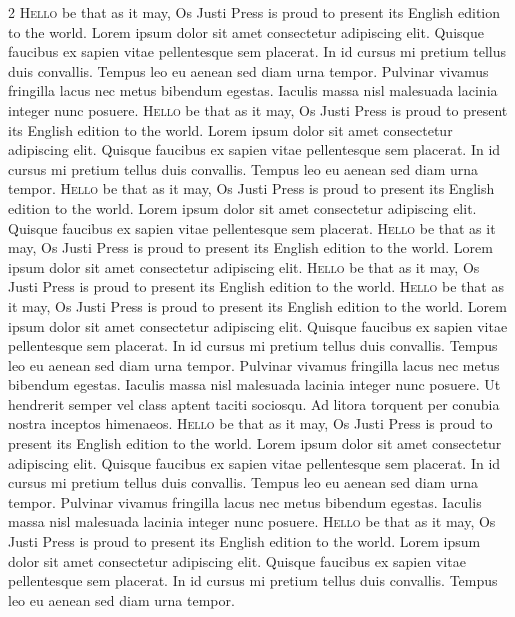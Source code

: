 \documentclass[openany]{book}
\begin{document}
\begin{multicols}{2}
\lettrine[lines=2]{H}{ello} be that as it may, Os Justi Press is proud to present its English edition to the world. Lorem ipsum dolor sit amet consectetur adipiscing elit. Quisque faucibus ex sapien vitae pellentesque sem placerat. In id cursus mi pretium tellus duis convallis. Tempus leo eu aenean sed diam urna tempor. Pulvinar vivamus fringilla lacus nec metus bibendum egestas. Iaculis massa nisl malesuada lacinia integer nunc posuere.
\lettrine[lines=2]{H}{ello} be that as it may, Os Justi Press is proud to present its English edition to the world. Lorem ipsum dolor sit amet consectetur adipiscing elit. Quisque faucibus ex sapien vitae pellentesque sem placerat. In id cursus mi pretium tellus duis convallis. Tempus leo eu aenean sed diam urna tempor.
\lettrine[lines=2]{H}{ello} be that as it may, Os Justi Press is proud to present its English edition to the world. Lorem ipsum dolor sit amet consectetur adipiscing elit. Quisque faucibus ex sapien vitae pellentesque sem placerat.
\lettrine[lines=2]{H}{ello} be that as it may, Os Justi Press is proud to present its English edition to the world. Lorem ipsum dolor sit amet consectetur adipiscing elit.
\lettrine[lines=2]{H}{ello} be that as it may, Os Justi Press is proud to present its English edition to the world.
\lettrine[lines=2]{H}{ello} be that as it may, Os Justi Press is proud to present its English edition to the world. Lorem ipsum dolor sit amet consectetur adipiscing elit. Quisque faucibus ex sapien vitae pellentesque sem placerat. In id cursus mi pretium tellus duis convallis. Tempus leo eu aenean sed diam urna tempor. Pulvinar vivamus fringilla lacus nec metus bibendum egestas. Iaculis massa nisl malesuada lacinia integer nunc posuere. Ut hendrerit semper vel class aptent taciti sociosqu. Ad litora torquent per conubia nostra inceptos himenaeos.
\lettrine[lines=2]{H}{ello} be that as it may, Os Justi Press is proud to present its English edition to the world. Lorem ipsum dolor sit amet consectetur adipiscing elit. Quisque faucibus ex sapien vitae pellentesque sem placerat. In id cursus mi pretium tellus duis convallis. Tempus leo eu aenean sed diam urna tempor. Pulvinar vivamus fringilla lacus nec metus bibendum egestas. Iaculis massa nisl malesuada lacinia integer nunc posuere.
\lettrine[lines=2]{H}{ello} be that as it may, Os Justi Press is proud to present its English edition to the world. Lorem ipsum dolor sit amet consectetur adipiscing elit. Quisque faucibus ex sapien vitae pellentesque sem placerat. In id cursus mi pretium tellus duis convallis. Tempus leo eu aenean sed diam urna tempor.

\end{multicols}
\end{document}
